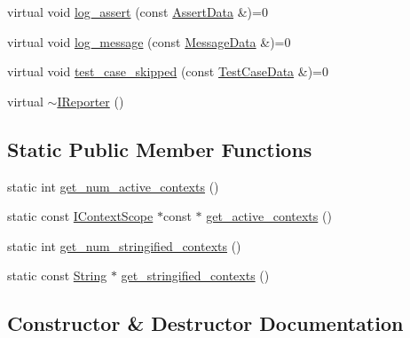 \begin{DoxyCompactItemize}
\item 
virtual void \hyperlink{structdoctest_1_1IReporter_a5bb54923eab233bb02f2fcfc178fa12a}{log\+\_\+assert} (const \hyperlink{structdoctest_1_1AssertData}{Assert\+Data} \&)=0
\item 
virtual void \hyperlink{structdoctest_1_1IReporter_a2b2cb4f15aa7417d4903a0edc3147018}{log\+\_\+message} (const \hyperlink{structdoctest_1_1MessageData}{Message\+Data} \&)=0
\item 
virtual void \hyperlink{structdoctest_1_1IReporter_ab4ecfea9cd9582aad4a5e90e0c8ba45d}{test\+\_\+case\+\_\+skipped} (const \hyperlink{structdoctest_1_1TestCaseData}{Test\+Case\+Data} \&)=0
\item 
virtual \hyperlink{structdoctest_1_1IReporter_ae772182e42f2a3b163497f2b8bc3636d}{$\sim$\+I\+Reporter} ()
\end{DoxyCompactItemize}
\subsection*{Static Public Member Functions}
\begin{DoxyCompactItemize}
\item 
static int \hyperlink{structdoctest_1_1IReporter_a7d520de46d9104c0eeb02375fabad32d}{get\+\_\+num\+\_\+active\+\_\+contexts} ()
\item 
static const \hyperlink{structdoctest_1_1IContextScope}{I\+Context\+Scope} $\ast$const  $\ast$ \hyperlink{structdoctest_1_1IReporter_a67a2da62d754d3b517d6d50ef210a988}{get\+\_\+active\+\_\+contexts} ()
\item 
static int \hyperlink{structdoctest_1_1IReporter_ac8b96fef046edc609a3374a61b84797d}{get\+\_\+num\+\_\+stringified\+\_\+contexts} ()
\item 
static const \hyperlink{classdoctest_1_1String}{String} $\ast$ \hyperlink{structdoctest_1_1IReporter_acc1a86891876a957c6fc382af7894f99}{get\+\_\+stringified\+\_\+contexts} ()
\end{DoxyCompactItemize}


\subsection{Constructor \& Destructor Documentation}
\mbox{\label{structdoctest_1_1IReporter_ae772182e42f2a3b163497f2b8bc3636d}} 
